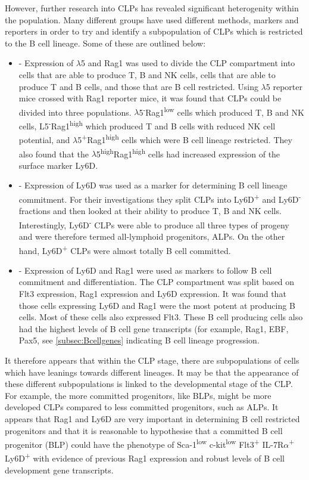 However, further research into CLPs has revealed significant heterogenity within the population.
Many different groups have used different methods, markers and reporters in order to try and identify a subpopulation of CLPs which is restricted to the B cell lineage. 
Some of these are outlined below:
\begin{itemize}
\item \citet{Mansson2010} - Expression of $\lambda$5 and Rag1 was used to divide the CLP compartment into cells that are able to produce T, B and NK cells, cells that are able to produce T and B cells, and those that are B cell restricted.
Using $\lambda$5 reporter mice crossed with Rag1 reporter mice, it was found that CLPs could be divided into three populations.
$\lambda$5\textsuperscript{-}Rag1\textsuperscript{low} cells which produced T, B and NK cells, L5\textsuperscript{-}Rag1\textsuperscript{high} which produced T and B cells with reduced NK cell potential, and $\lambda$5\textsuperscript{+}Rag1\textsuperscript{high} cells which were B cell lineage restricted.
They also found that the $\lambda$5\textsuperscript{high}Rag1\textsuperscript{high} cells had increased expression of the surface marker Ly6D.
\item \citet{Inlay2009} - Expression of Ly6D was used as a marker for determining B cell lineage commitment.
For their investigations they split CLPs into Ly6D\textsuperscript{+} and Ly6D\textsuperscript{-} fractions and then looked at their ability to produce T, B and NK cells.
Interestingly, Ly6D\textsuperscript{-} CLPs were able to produce all three types of progeny and were therefore termed all-lymphoid progenitors, ALPs.
On the other hand, Ly6D\textsuperscript{+} CLPs were almost totally B cell committed.
\item \citet{Zhang2013} - Expression of Ly6D and Rag1 were used as markers to follow B cell commitment and differentiation.
The CLP compartment was split based on Flt3 expression, Rag1 expression and Ly6D expression.
It was found that those cells expressing Ly6D and Rag1 were the most potent at producing B cells. 
Most of these cells also expressed Flt3.
These B cell producing cells also had the highest levels of B cell gene transcripts (for example, Rag1, EBF, Pax5, see \cref{subsec:Bcellgenes} indicating B cell lineage progression.
\end{itemize}

It therefore appears that within the CLP stage, there are subpopulations of cells which have leanings towards different lineages.
It may be that the appearance of these different subpopulations is linked to the developmental stage of the CLP.
For example, the more committed progenitors, like BLPs, might be more developed CLPs compared to less committed progenitors, such as ALPs.
It appears that Rag1 and Ly6D are very important in determining B cell restricted progenitors and that it is reasonable to hypothesise that a committed B cell progenitor (BLP) could have the phenotype of Sca-1\textsuperscript{low} c-kit\textsuperscript{low} Flt3\textsuperscript{+} IL-7R$\alpha$\textsuperscript{+} Ly6D\textsuperscript{+} with evidence of previous Rag1 expression and robust levels of B cell development gene transcripts.

